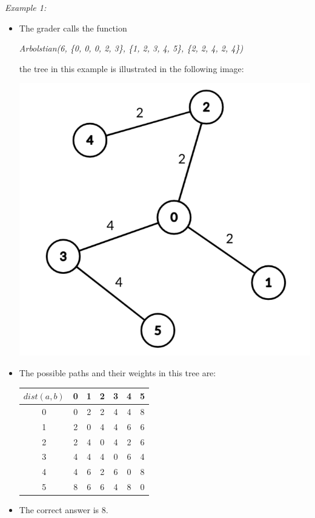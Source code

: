 \documentclass[12pt]{scrartcl}
\begin{document}
        {\itshape Example 1:}
        \begin{itemize}
            \item The grader calls the function 
            \begin{center}
                    \textit{Arbolstian(6, \{0, 0, 0, 2, 3\}, \{1, 2, 3, 4, 5\}, \{2, 2, 4, 2, 4\})} 
            \end{center}
            the tree in this example is illustrated in the following image:
            
            \begin{center}
                \includegraphics[scale=0.25]{ej1.png}
            \end{center}
            \item The possible paths and their weights in this tree are:
            \begin{center}
                \begin{tabular}{|c||c|c|c|c|c|c|}
                    \hline
                     $dist(a, b)$ & 0 & 1 & 2 & 3 & 4 & 5 \\
                     \hline
                     \hline
                     0 & 0 & 2 & 2 & 4 & 4 & 8 \\
                     \hline
                     1 & 2 & 0 & 4 & 4 & 6 & 6 \\
                     \hline
                     2 & 2 & 4 & 0 & 4 & 2 & 6 \\
                     \hline
                     3 & 4 & 4 & 4 & 0 & 6 & 4 \\
                     \hline
                     4 & 4 & 6 & 2 & 6 & 0 & 8 \\
                     \hline
                     5 & 8 & 6 & 6 & 4 & 8 & 0 \\ 
                     \hline
                \end{tabular}
            \end{center}
            \item The correct answer is $8$.
        \end{itemize}
\end{document}
